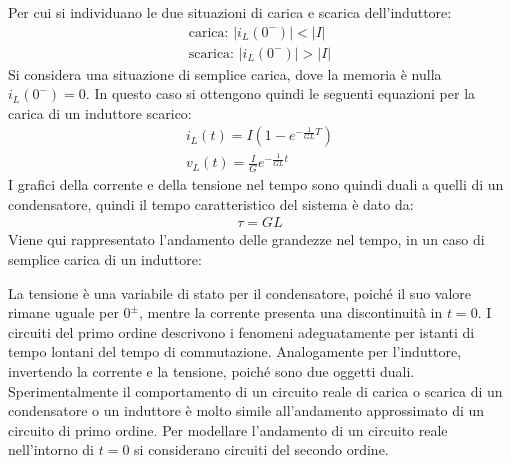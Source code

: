 \documentclass{article}
\numberwithin{equation}{subsection}
\begin{document}
Per cui si individuano le due situazioni di carica e scarica dell'induttore:
\begin{gather*}
    \mbox{carica: }|i_L(0^-)|<|I|\\
    \mbox{scarica: }|i_L(0^-)|>|I|
\end{gather*}
Si considera una situazione di semplice carica, dove la memoria è nulla $i_L(0^-)=0$.
In questo caso si ottengono quindi le seguenti equazioni per la carica di un induttore scarico:
\begin{gather*}
    i_L(t)=I\left(1-e^{-\frac{1}{GL}T}\right)\\
    v_L(t)=\displaystyle\frac{I}{G}e^{-\frac{1}{GL}t}
\end{gather*}
I grafici della corrente e della tensione nel tempo sono quindi duali a quelli di un condensatore, quindi il tempo caratteristico del sistema è dato da:
\begin{gather*}
    \tau=GL
\end{gather*}
Viene qui rappresentato l'andamento delle grandezze nel tempo, in un caso di semplice carica di un induttore:
\begin{center}
\end{center}


La tensione è una variabile di stato per il condensatore, poiché il suo valore rimane uguale per $0^{\pm}$, mentre la corrente presenta una discontinuità in $t=0$. I 
circuiti del primo ordine descrivono i fenomeni adeguatamente per istanti di tempo lontani del tempo di commutazione. %
Analogamente per l'induttore, invertendo la corrente e la tensione, poiché sono due oggetti duali. 
Sperimentalmente il comportamento di un circuito reale di carica o scarica di un condensatore o un induttore è molto simile all'andamento approssimato di un circuito di primo 
ordine. Per modellare l'andamento di un circuito reale nell'intorno di $t=0$ si considerano circuiti del secondo ordine. 
\end{document}
